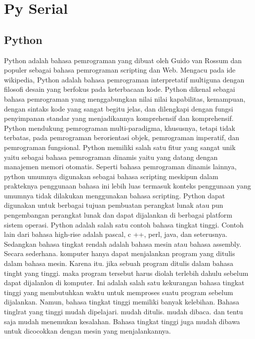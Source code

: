 \section{Py Serial}

	\subsection{Python}
	Python adalah bahasa pemrograman yang dibuat oleh Guido van Rossum dan populer sebagai bahasa pemrograman scripting dan Web. Mengacu pada ide wikipedia, Python adalah bahasa pemrograman interpretatif multiguna dengan filosofi desain yang berfokus pada keterbacaan kode. 
	Python dikenal sebagai bahasa pemrograman yang menggabungkan nilai nilai kapabilitas, kemampuan, dengan sintaks kode yang sangat begitu jelas, dan dilengkapi dengan fungsi penyimpanan standar yang menjadikannya komprehensif dan komprehensif. 
	Python mendukung pemrograman multi-paradigma, khususnya, tetapi tidak terbatas, pada pemrograman berorientasi objek, pemrograman imperatif, dan pemrograman fungsional. 
	Python memiliki salah satu fitur yang sangat unik yaitu sebagai bahasa pemrograman dinamis yaitu yang datang dengan manajemen memori otomatis. Seperti bahasa 
	pemrograman dinamis lainnya, python umumnya digunakan sebagai bahasa scripting meskipun dalam prakteknya penggunaan bahasa ini lebih luas termasuk konteks penggunaan yang umumnya tidak dilakukan menggunakan bahasa scripting. 
	Python dapat digunakan untuk berbagai tujuan pembuatan perangkat lunak atau pun pengembangan perangkat lunak dan dapat dijalankan di berbagai platform sistem operasi. Python adalah salah satu contoh bahasa tingkat tinggi. 
	Contoh lain dari bahasa high-rise adalah pascal, c ++, perl, java, dan seterusnya. Sedangkan bahasa tingkat rendah adalah bahasa mesin atau bahasa assembly. 
	Secara sederhana. komputer hanya dapat menjalankan program yang ditulis dalam bahasa mesin. Karena itu. jika sebuah program ditulis dalam bahasa tinght yang tinggi. maka program tersebut harus diolah terlebih dahulu sebelum dapat dijalanlon di komputer. 
	Ini adalah salah satu kekurangan bahasa tingkat tinggi yang membutuhkan waktu untuk memproses suatu program sebelum dijalankan. Namun, bahasa tingkat tinggi memiliki banyak kelebihan. Bahasa tinglrat yang tinggi mudah dipelajari. mudah ditulis. mudah dibaca. dan tentu saja mudah menemukan kesalahan. Bahasa tingkat tinggi juga mudah dibawa untuk dicocokkan dengan mesin yang menjalankannya. 
	
